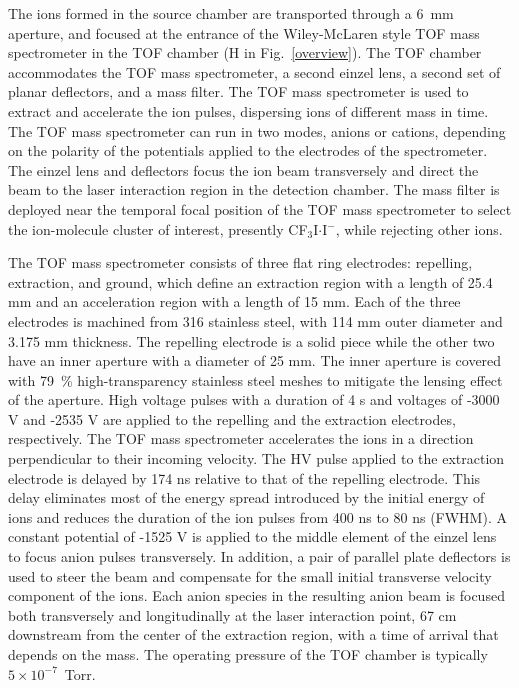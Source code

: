 \documentclass[%
aip,
rsi,
 amsmath,amssymb,
reprint,%
]{revtex4-1}
\begin{document}
The ions formed in the source chamber are transported through a 6~mm aperture, and focused at the entrance of the Wiley-McLaren style TOF mass spectrometer\cite{wiley_timeflight_1955} in the TOF chamber (H in Fig.~\ref{overview}). The TOF chamber accommodates the TOF mass spectrometer, a second einzel lens, a second set of planar deflectors, and a mass filter. The TOF mass spectrometer is used to extract and accelerate the ion pulses, dispersing ions of different mass in time. The TOF mass spectrometer can run in two modes, anions or cations, depending on the polarity of the potentials applied to the electrodes of the spectrometer. The einzel lens and deflectors focus the ion beam transversely and direct the beam to the laser interaction region in the detection chamber. The mass filter is deployed near the temporal focal position of the TOF mass spectrometer to select the ion-molecule cluster of interest, presently CF$_3$I$\cdot$I$^-$, while rejecting other ions.

The TOF mass spectrometer consists of three flat ring electrodes: repelling, extraction, and ground, which define an extraction region with a length of 25.4 mm and an acceleration region with a length of 15 mm. Each of the three electrodes is machined from 316 stainless steel, with 114 mm outer diameter and 3.175 mm thickness. The repelling electrode is a solid piece while the other two have an inner aperture with a diameter of 25 mm. The inner aperture is covered with 79~\% high-transparency stainless steel meshes to mitigate the lensing effect of the aperture\cite{liebl2008applied}. High voltage pulses with a duration of 4 {\textmu}s and voltages of -3000 V and -2535 V are applied to the repelling and the extraction electrodes, respectively. The TOF mass spectrometer accelerates the ions in a direction perpendicular to their incoming velocity. The HV pulse applied to the extraction electrode is delayed by 174 ns relative to that of the repelling electrode. This delay eliminates most of the energy spread introduced by the initial energy of ions and reduces the duration of the ion pulses from 400 ns to 80 ns (FWHM). A constant potential of -1525 V is applied to the middle element of the einzel lens to focus anion pulses transversely. In addition, a pair of parallel plate deflectors is used to steer the beam and compensate for the small initial transverse velocity component of the ions. Each anion species in the resulting anion beam is focused both transversely and longitudinally at the laser interaction point, 67 cm downstream from the center of the extraction region, with a time of arrival that depends on the mass. The operating pressure of the TOF chamber is typically $5\times10^{-7}$~Torr.
\end{document}
